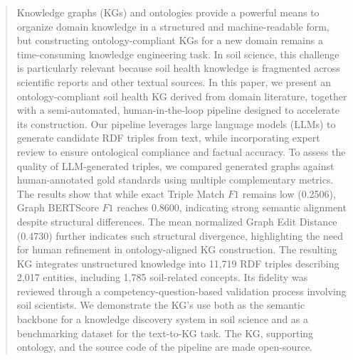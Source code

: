 \documentclass[preprint,12pt]{elsarticle}
\begin{document}
\begin{frontmatter}
\begin{abstract}
Knowledge graphs (KGs) and ontologies provide a powerful means to organize domain knowledge in a structured and machine-readable form, but constructing ontology-compliant KGs for a new domain remains a time-consuming knowledge engineering task. In soil science, this challenge is particularly relevant because soil health knowledge is fragmented across scientific reports and other textual sources. In this paper, we present an ontology-compliant soil health KG derived from domain literature, together with a semi-automated, human-in-the-loop pipeline designed to accelerate its construction. Our pipeline leverages large language models (LLMs) to generate candidate RDF triples from text, while incorporating expert review to ensure ontological compliance and factual accuracy. To assess the quality of LLM-generated triples, we compared generated graphs against human-annotated gold standards using multiple complementary metrics. The results show that while exact Triple Match $F1$ remains low (0.2506), Graph BERTScore $F1$ reaches 0.8600, indicating strong semantic alignment despite structural differences. The mean normalized Graph Edit Distance (0.4730) further indicates such structural divergence, highlighting the need for human refinement in ontology-aligned KG construction. The resulting KG integrates unstructured knowledge into 11,719 RDF triples describing 2,017 entities, including 1,785 soil-related concepts. Its fidelity was reviewed through a competency-question-based validation process involving soil scientists. We demonstrate the KG’s use both as the semantic backbone for a knowledge discovery system in soil science and as a benchmarking dataset for the text-to-KG task. The KG, supporting ontology, and the source code of the pipeline are made open-source.
\end{abstract}





\end{frontmatter}
\end{document}
